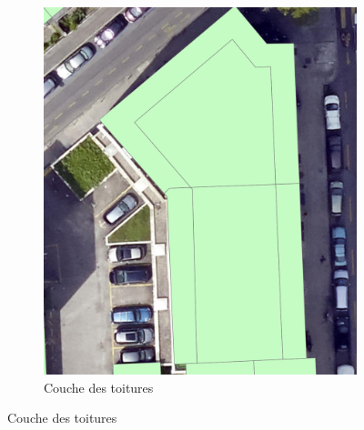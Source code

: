 \begin{figure}[H]
\begin{subfigure}[b]{0.48\textwidth}
        \includegraphics[width=\textwidth]{02-main/figures/ch3/ch3_piste_exploree_classification_08_resultats_image_toiture.png}
        \caption{Couche des toitures}
        \label{fig:ch3_piste_exploree_classification_08_resultats_image_toiture}
    \end{subfigure}
    
    \vspace{0.35cm} %
    

\end{figure}
